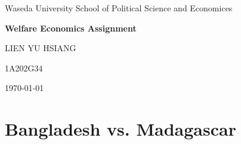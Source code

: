 \documentclass{article}[13pt]
\begin{document}
\begin{titlepage}
    \centering
    \vspace*{5cm}
    {\Large Waseda University School of Political Science and Economices}\par
    \vspace{1cm}
    {\LARGE \textbf{Welfare Economics Assignment}}\par
    \vspace{1cm}
    {\Large LIEN YU HSIANG}\par
    \vspace{1cm}
    {\Large 1A202G34}\par
    \vspace{1cm}
    {\Large \today}\par
    \vspace{2cm}
\end{titlepage}

\section{Bangladesh vs. Madagascar}
\end{document}

